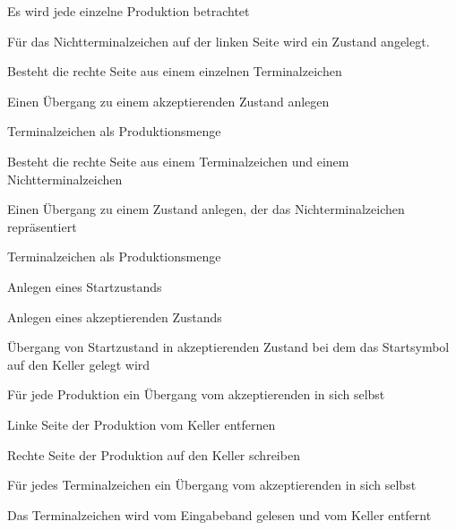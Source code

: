 {
    \begin{itemgroup}{}
	\item Es wird jede einzelne Produktion betrachtet
	\item Für das Nichtterminalzeichen auf der linken Seite wird ein Zustand
	angelegt.
	\item Besteht die rechte Seite aus einem einzelnen Terminalzeichen
  		\begin{itemgroup}{}
    	\item Einen Übergang zu einem akzeptierenden Zustand anlegen
    	\item Terminalzeichen als Produktionsmenge
    	\end{itemgroup}
	\item Besteht die rechte Seite aus einem Terminalzeichen und einem Nichtterminalzeichen
  		\begin{itemgroup}{}
    	\item Einen Übergang zu einem Zustand anlegen, der das Nichterminalzeichen
    	repräsentiert
		\item Terminalzeichen als Produktionsmenge
		 \end{itemgroup}
    \end{itemgroup}
	\vfill{}
}


{
    \begin{itemgroup}{}
	\item Anlegen eines Startzustands
	\item Anlegen eines akzeptierenden Zustands
	\item Übergang von Startzustand in akzeptierenden Zustand bei dem das 
	Startsymbol auf den Keller gelegt wird
	\item Für jede Produktion ein Übergang vom akzeptierenden in sich selbst
		\begin{itemgroup}{}
    	\item Linke Seite der Produktion vom Keller entfernen
    	\item Rechte Seite der Produktion auf den Keller schreiben
    	\end{itemgroup}
	\item Für jedes Terminalzeichen ein Übergang vom akzeptierenden in sich selbst
		\begin{itemgroup}{}
    	\item Das Terminalzeichen wird vom Eingabeband gelesen und vom Keller
    	entfernt \end{itemgroup}
	\end{itemgroup}
  
	\vfill{}
}


